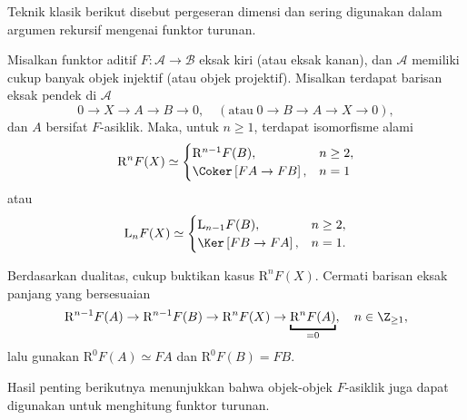 Teknik klasik berikut disebut pergeseran dimensi dan sering digunakan dalam argumen rekursif mengenai funktor turunan.

\begin{proposisi}\label{prop:dimension-shifting}
	Misalkan funktor aditif $F: \mathcal{A} \to \mathcal{B}$ eksak kiri (atau eksak kanan), dan $\mathcal{A}$ memiliki cukup banyak objek injektif (atau objek projektif). Misalkan terdapat barisan eksak pendek di $\mathcal{A}$
	\[ 0 \to X \to A \to B \to 0, \quad (\text{atau}\; 0 \to B \to A \to X \to 0 ), \]
	dan $A$ bersifat $F$-asiklik. Maka, untuk $n \geq 1$, terdapat isomorfisme alami
	\[\mathrm{R}^n F(X) \simeq \begin{cases}
		\mathrm{R}^{n-1} F(B), & n \geq 2, \\
		\Coker\left[FA \to FB \right], & n = 1
	\end{cases}\]
	atau
	\[ \mathrm{L}_n F(X) \simeq \begin{cases}
		\mathrm{L}_{n-1} F(B), & n \geq 2, \\
		\Ker\left[ FB \to FA \right], & n = 1.
	\end{cases} \]
\end{proposisi}
\begin{bukti}
	Berdasarkan dualitas, cukup buktikan kasus $\mathrm{R}^n F(X)$. Cermati barisan eksak panjang yang bersesuaian
	\[ \mathrm{R}^{n-1} F(A) \to \mathrm{R}^{n-1} F(B) \to \mathrm{R}^n F(X) \to \underbracket{\mathrm{R}^n F(A)}_{= 0}, \quad n \in \Z_{\geq 1}, \]
	lalu gunakan $\mathrm{R}^0 F(A) \simeq FA$ dan $\mathrm{R}^0 F(B) = FB$.
\end{bukti}

Hasil penting berikutnya menunjukkan bahwa objek-objek $F$-asiklik juga dapat digunakan untuk menghitung funktor turunan.


